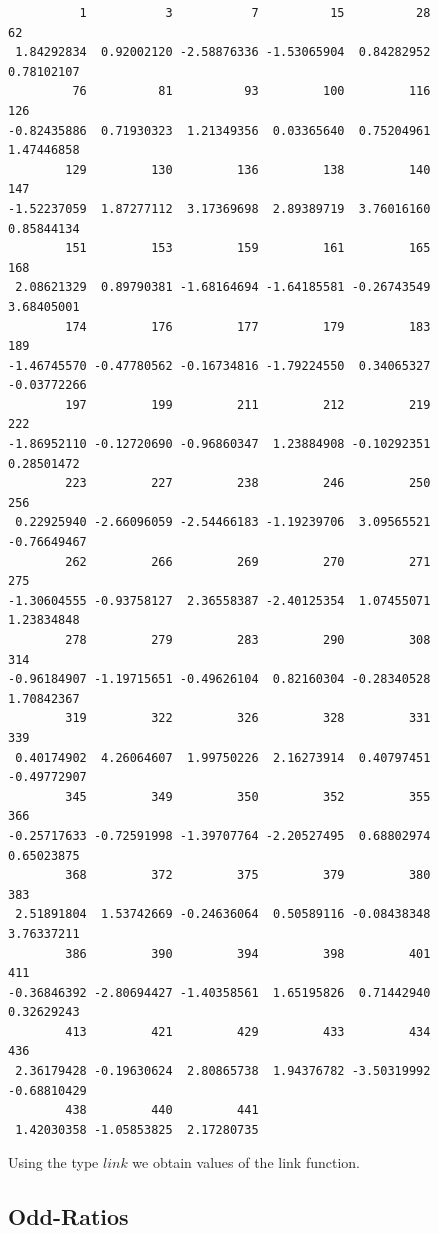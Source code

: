 \documentclass[
]{article}
\begin{document}
\begin{verbatim}
          1           3           7          15          28          62 
 1.84292834  0.92002120 -2.58876336 -1.53065904  0.84282952  0.78102107 
         76          81          93         100         116         126 
-0.82435886  0.71930323  1.21349356  0.03365640  0.75204961  1.47446858 
        129         130         136         138         140         147 
-1.52237059  1.87277112  3.17369698  2.89389719  3.76016160  0.85844134 
        151         153         159         161         165         168 
 2.08621329  0.89790381 -1.68164694 -1.64185581 -0.26743549  3.68405001 
        174         176         177         179         183         189 
-1.46745570 -0.47780562 -0.16734816 -1.79224550  0.34065327 -0.03772266 
        197         199         211         212         219         222 
-1.86952110 -0.12720690 -0.96860347  1.23884908 -0.10292351  0.28501472 
        223         227         238         246         250         256 
 0.22925940 -2.66096059 -2.54466183 -1.19239706  3.09565521 -0.76649467 
        262         266         269         270         271         275 
-1.30604555 -0.93758127  2.36558387 -2.40125354  1.07455071  1.23834848 
        278         279         283         290         308         314 
-0.96184907 -1.19715651 -0.49626104  0.82160304 -0.28340528  1.70842367 
        319         322         326         328         331         339 
 0.40174902  4.26064607  1.99750226  2.16273914  0.40797451 -0.49772907 
        345         349         350         352         355         366 
-0.25717633 -0.72591998 -1.39707764 -2.20527495  0.68802974  0.65023875 
        368         372         375         379         380         383 
 2.51891804  1.53742669 -0.24636064  0.50589116 -0.08438348  3.76337211 
        386         390         394         398         401         411 
-0.36846392 -2.80694427 -1.40358561  1.65195826  0.71442940  0.32629243 
        413         421         429         433         434         436 
 2.36179428 -0.19630624  2.80865738  1.94376782 -3.50319992 -0.68810429 
        438         440         441 
 1.42030358 -1.05853825  2.17280735 
\end{verbatim}

Using the type \(link\) we obtain values of the link function.

\hypertarget{odd-ratios}{%
\subsection{Odd-Ratios}\label{odd-ratios}}
\end{document}
